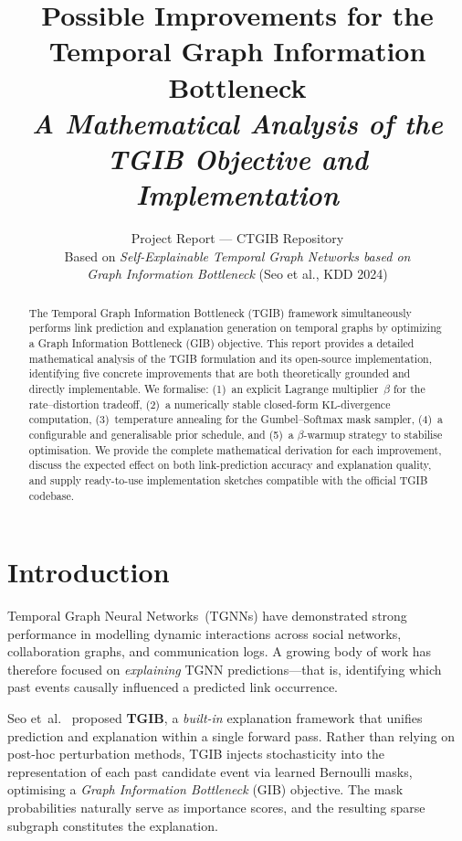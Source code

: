 \documentclass[11pt,a4paper]{article}
\title{\vspace{-1.0cm}
\textbf{Possible Improvements for the\\Temporal Graph Information Bottleneck}\\[0.4em]
\normalsize\textit{A Mathematical Analysis of the TGIB Objective and Implementation}}
\date{}
\author{%
  Project Report — CTGIB Repository\\[0.2em]
  \small Based on \textit{Self-Explainable Temporal Graph Networks based on\\
  Graph Information Bottleneck} (Seo et al., KDD 2024)}
\newcommand{\KL}{\mathrm{KL}}
\begin{document}
\maketitle

\begin{abstract}
\noindent
The Temporal Graph Information Bottleneck (TGIB) framework simultaneously
performs link prediction and explanation generation on temporal graphs by
optimizing a Graph Information Bottleneck (GIB) objective. This report
provides a detailed mathematical analysis of the TGIB formulation and
its open-source implementation, identifying five concrete improvements
that are both theoretically grounded and directly implementable. We
formalise: (1)~an explicit Lagrange multiplier~$\beta$ for the
rate--distortion tradeoff, (2)~a numerically stable closed-form
$\KL$-divergence computation, (3)~temperature annealing for the
Gumbel--Softmax mask sampler, (4)~a configurable and generalisable
prior schedule, and (5)~a $\beta$-warmup strategy to stabilise
optimisation. We provide the complete mathematical derivation for each
improvement, discuss the expected effect on both link-prediction
accuracy and explanation quality, and supply ready-to-use
implementation sketches compatible with the official TGIB codebase.
\end{abstract}

\tableofcontents
\newpage

\section{Introduction}
\label{sec:introduction}

Temporal Graph Neural Networks~(TGNNs) have demonstrated strong
performance in modelling dynamic interactions across social networks,
collaboration graphs, and communication logs. A growing body of work
has therefore focused on \emph{explaining} TGNN predictions---that is,
identifying which past events causally influenced a predicted link
occurrence.

Seo et~al.~\cite{seo2024tgib} proposed \textbf{TGIB}, a \emph{built-in}
explanation framework that unifies prediction and explanation within a
single forward pass. Rather than relying on post-hoc perturbation
methods, TGIB injects stochasticity into the representation of each
past candidate event via learned Bernoulli masks, optimising a
\emph{Graph Information Bottleneck} (GIB) objective. The mask
probabilities naturally serve as importance scores, and the resulting
sparse subgraph constitutes the explanation.
\end{document}
